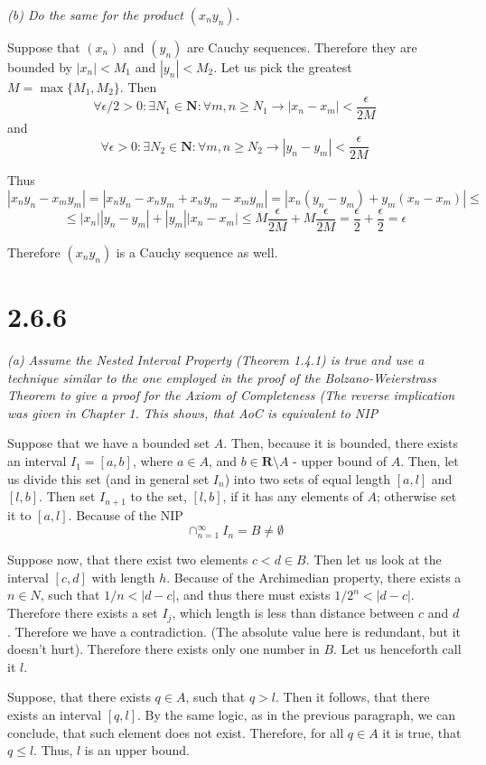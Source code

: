 \documentclass[11pt,oneside,titlepage]{book}
\begin{document}
\textit{(b) Do the same for the product $(x_n y_n)$.}

Suppose that $(x_n)$ and $(y_n)$ are Cauchy sequences. Therefore
they are bounded by $|x_n| < M_1$ and $|y_n| < M_2$. Let us pick the
greatest $M = \max\{M_1, M_2\}$. Then
$$\forall \epsilon/2 > 0: \exists N_1 \in \textbf{N}: \forall m,n \geq N_1 \to
|x_n - x_m| < \frac{\epsilon}{2M}$$
and
$$\forall \epsilon > 0: \exists N_2 \in \textbf{N}: \forall m,n \geq N_2 \to
|y_n - y_m| < \frac{\epsilon}{2M}$$

Thus 
$$|x_n y_n - x_m y_m| = |x_n y_n - x_n y_m + x_n y_m - x_m y_m | =
|x_n (y_n - y_m) +  y_m( x_n - x_m) | \leq$$
$$ \leq |x_n||y_n - y_m| + |y_m| |x_n - x_m| \leq M \frac{\epsilon}{2M} +
M \frac{\epsilon}{2M} = \frac{\epsilon}{2} + \frac{\epsilon}{2} = \epsilon$$

Therefore $(x_n y_n)$ is a Cauchy sequence as well.

\section*{2.6.6}

\textit{(a) Assume the Nested Interval Property (Theorem 1.4.1) is true and
  use a technique similar to the one employed in the proof of the
  Bolzano-Weierstrass Theorem to give a proof for the Axiom of Completeness
  (The reverse implication was given in Chapter 1. This shows, that AoC is
  equivalent to NIP}

Suppose that we have a bounded set $A$. Then, because it is bounded, there
exists an interval $I_1 = [a, b]$, where $a \in A$, and
$b \in \textbf{R} \setminus A$ - upper bound of $A$. Then, let us
divide this set (and in general set $I_n$) into two sets of equal
length $[a, l]$ and $[l, b]$.
Then set $I_{n + 1}$ to the set, $[l, b]$, if it has any elements of $A$;
otherwise set it to $[a, l]$. Because of the NIP
$$\cap_{n = 1}^{\infty} I_n  = B\neq \emptyset$$

Suppose now, that there exist two elements $c < d \in B$. Then let us
look at the interval $[c, d]$ with length $h$. Because of the Archimedian
property, there exists a $n \in N$, such that $1/n < |d - c|$, and thus
there must exists $1/2^n < |d - c|$. Therefore there exists a set $I_j$, which
length is less than distance between $c$ and $d$. Therefore we
have a contradiction. (The absolute value here is redundant, but it doesn't
hurt). Therefore there exists only one number in $B$. Let us henceforth call
it $l$.

Suppose, that there exists  $q \in A$, such that $q > l$. Then it follows,
that there exists an interval $[q, l]$. By the same logic, as in the previous
paragraph, we can conclude, that such element does not exist. Therefore,
for all $q \in A$ it is true, that $q \leq l$. Thus, $l$ is an upper bound.
\end{document}
